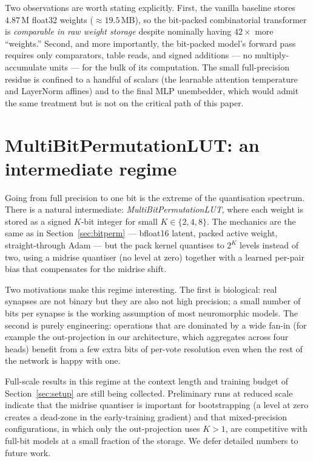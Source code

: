 \documentclass[11pt]{article}
\begin{document}
Two observations are worth stating explicitly.
First, the vanilla baseline stores $4.87$\,M float32 weights ($\approx\!19.5$\,MB), so the bit-packed combinatorial transformer is \emph{comparable in raw weight storage} despite nominally having $42\times$ more ``weights.''
Second, and more importantly, the bit-packed model's forward pass requires only comparators, table reads, and signed additions --- no multiply-accumulate units --- for the bulk of its computation.
The small full-precision residue is confined to a handful of scalars (the learnable attention temperature and LayerNorm affines) and to the final MLP unembedder, which would admit the same treatment but is not on the critical path of this paper.


\section{MultiBitPermutationLUT: an intermediate regime}
\label{sec:multibit}

Going from full precision to one bit is the extreme of the quantisation spectrum.
There is a natural intermediate: \emph{MultiBitPermutationLUT}, where each weight is stored as a signed $K$-bit integer for small $K \in \{2, 4, 8\}$.
The mechanics are the same as in Section~\ref{sec:bitperm} --- bfloat16 latent, packed active weight, straight-through Adam --- but the pack kernel quantises to $2^K$ levels instead of two, using a midrise quantiser (no level at zero) together with a learned per-pair bias that compensates for the midrise shift.

Two motivations make this regime interesting.
The first is biological: real synapses are not binary but they are also not high precision; a small number of bits per synapse is the working assumption of most neuromorphic models.
The second is purely engineering: operations that are dominated by a wide fan-in (for example the out-projection in our architecture, which aggregates across four heads) benefit from a few extra bits of per-vote resolution even when the rest of the network is happy with one.

Full-scale results in this regime at the context length and training budget of Section~\ref{sec:setup} are still being collected.
Preliminary runs at reduced scale indicate that the midrise quantiser is important for bootstrapping (a level at zero creates a dead-zone in the early-training gradient) and that mixed-precision configurations, in which only the out-projection uses $K > 1$, are competitive with full-bit models at a small fraction of the storage.
We defer detailed numbers to future work.
\end{document}
